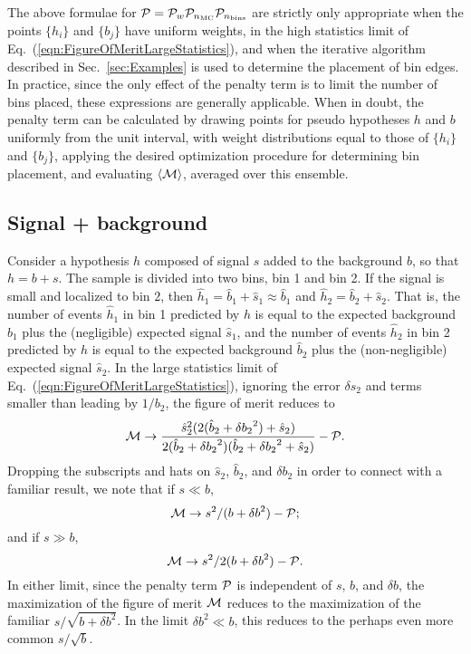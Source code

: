 \documentclass[twocolumn,twoside,prd]{revtex4} %
\begin{document}
The above formulae for ${\cal P} = {\cal P}_w {\cal P}_{n_\text{MC}} {\cal P}_{n_\text{bins}}$ are strictly only appropriate when the points $\{ h_i \}$ and $\{ b_j \}$ have uniform weights, in the high statistics limit of Eq.~(\ref{eqn:FigureOfMeritLargeStatistics}), and when the iterative algorithm described in Sec.~\ref{sec:Examples} is used to determine the placement of bin edges.  In practice, since the only effect of the penalty term is to limit the number of bins placed, these expressions are generally applicable.  When in doubt, the penalty term can be calculated by drawing points for pseudo hypotheses $h$ and $b$ uniformly from the unit interval, with weight distributions equal to those of $\{ h_i \}$ and $\{ b_j \}$, applying the desired optimization procedure for determining bin placement, and evaluating $\langle {\cal M} \rangle$, averaged over this ensemble.

\subsection{Signal + background}

Consider a hypothesis $h$ composed of signal $s$ added to the background $b$, so that $h=b+s$.  The sample is divided into two bins, bin 1 and bin 2.  If the signal is small and localized to bin $2$, then $\hat h_1=\hat b_1+\hat s_1\approx \hat b_1$ and $\hat h_2 = \hat b_2 + \hat s_2$.  That is, the number of events $\hat h_1$ in bin 1 predicted by $h$ is equal to the expected background $\hat b_1$ plus the (negligible) expected signal $\hat s_1$, and the number of events $\hat h_2$ in bin 2 predicted by $h$ is equal to the expected background $\hat b_2$ plus the (non-negligible) expected signal $\hat s_2$.  In the large statistics limit of Eq.~(\ref{eqn:FigureOfMeritLargeStatistics}), ignoring the error $\delta s_2$ and terms smaller than leading by $1/b_2$, the figure of merit reduces to
\begin{equation}
{\cal M} \rightarrow \frac{ {\hat s_2}^2 (2 (\hat b_2 + {\delta b_2}^2) + \hat s_2) }{ 2 (\hat b_2 + {\delta b_2}^2)(\hat b_2 + {\delta b_2}^2 + \hat s_2) } - {\cal P}.
\end{equation}
Dropping the subscripts and hats on $\hat s_2$, $\hat b_2$, and $\delta b_2$ in order to connect with a familiar result, we note that if $s \ll b$, 
\begin{equation}
{\cal M} \rightarrow s^2/(b+{\delta b}^2) - {\cal P};
\end{equation}
and if $s \gg b$, 
\begin{equation}
{\cal M} \rightarrow s^2/2(b+{\delta b}^2) - {\cal P}.
\end{equation}
In either limit, since the penalty term ${\cal P}$ is independent of $s$, $b$, and $\delta b$, the maximization of the figure of merit ${\cal M}$ reduces to the maximization of the familiar $s/\sqrt{b+{\delta b}^2}$.  In the limit ${\delta b}^2 \ll b$, this reduces to the perhaps even more common $s/\sqrt{b}$.
\end{document}
